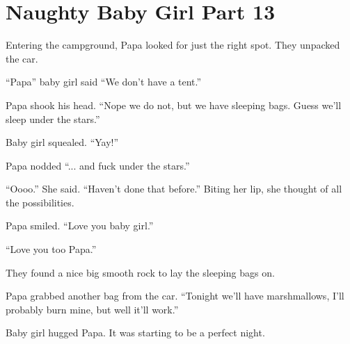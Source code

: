 \section{Naughty Baby Girl Part 13}

    Entering the campground, Papa looked for just the right spot. They unpacked the car.

    “Papa” baby girl said “We don’t have a tent.”

    Papa shook his head. “Nope we do not, but we have sleeping bags. Guess we’ll sleep under the stars.”

    Baby girl squealed. “Yay!”

    Papa nodded “... and fuck under the stars.”

    “Oooo.” She said. “Haven’t done that before.” Biting her lip, she thought of all the possibilities.

    Papa smiled. “Love you baby girl.”

    “Love you too Papa.”

    They found a nice big smooth rock to lay the sleeping bags on.

    Papa grabbed another bag from the car. “Tonight we’ll have marshmallows, I’ll probably burn mine, but well it’ll work.”

    Baby girl hugged Papa. It was starting to be a perfect night.

